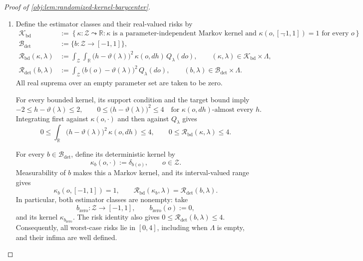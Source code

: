 \documentclass[11pt]{article}
\begin{document}
\begin{proof}[Proof of \cref{obj:lem:randomized-kernel-barycenter}]
\begin{enumerate}
\item Define the estimator classes and their real-valued risks by
\[
\begin{aligned}
\mathcal K_{\mathrm{bd}}
&:=
\left\{\kappa:\mathcal Z\leadsto\mathbb R:
\kappa\text{ is a parameter-independent Markov kernel and }
\kappa(o,[-1,1])=1\text{ for every }o\right\},\\
\mathcal B_{\mathrm{det}}
&:=\{b:\mathcal Z\to[-1,1]\},\\
\mathcal R_{\mathrm{bd}}(\kappa,\lambda)
&:=
\int_{\mathcal Z}\int_{\mathbb R}
\bigl(h-\vartheta(\lambda)\bigr)^2\,\kappa(o,dh)\,Q_\lambda(do),
\qquad (\kappa,\lambda)\in\mathcal K_{\mathrm{bd}}\times\Lambda,\\
\mathcal R_{\mathrm{det}}(b,\lambda)
&:=
\int_{\mathcal Z}\bigl(b(o)-\vartheta(\lambda)\bigr)^2\,Q_\lambda(do),
\qquad (b,\lambda)\in\mathcal B_{\mathrm{det}}\times\Lambda.
\end{aligned}
\]
All real suprema over an empty parameter set are taken to be zero.

For every bounded kernel, its support condition and the target bound imply
\[
-2\le h-\vartheta(\lambda)\le2,
\qquad
0\le\bigl(h-\vartheta(\lambda)\bigr)^2\le4
\quad\text{for }\kappa(o,dh)\text{-almost every }h.
\]
Integrating first against \(\kappa(o,\cdot)\) and then against \(Q_\lambda\) gives
\[
0\le
\int_{\mathbb R}\bigl(h-\vartheta(\lambda)\bigr)^2\,\kappa(o,dh)
\le4,
\qquad
0\le\mathcal R_{\mathrm{bd}}(\kappa,\lambda)\le4.
\]

For every \(b\in\mathcal B_{\mathrm{det}}\), define its deterministic kernel by
\[
\kappa_b(o,\cdot):=\delta_{b(o)},
\qquad o\in\mathcal Z.
\]
Measurability of \(b\) makes this a Markov kernel, and its interval-valued range gives
\[
\kappa_b(o,[-1,1])=1,
\qquad
\mathcal R_{\mathrm{bd}}(\kappa_b,\lambda)
=\mathcal R_{\mathrm{det}}(b,\lambda).
\]
In particular, both estimator classes are nonempty: take
\[
b_{\mathrm{zero}}:\mathcal Z\to[-1,1],
\qquad b_{\mathrm{zero}}(o):=0,
\]
and its kernel \(\kappa_{b_{\mathrm{zero}}}\). The risk identity also gives
\(0\le\mathcal R_{\mathrm{det}}(b,\lambda)\le4\).
Consequently, all worst-case risks lie in \([0,4]\), including when
\(\Lambda\) is empty, and their infima are well defined.


\end{enumerate}
\end{proof}
\end{document}
